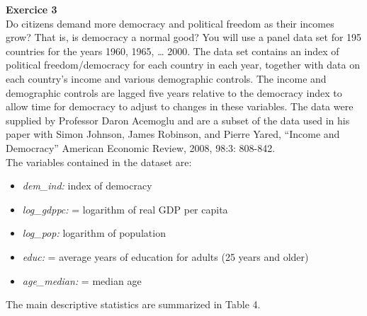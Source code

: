 \documentclass{article}
\begin{document}
\newpage

\textbf{Exercice 3} \\[1em]

Do citizens demand more democracy and political freedom as their incomes grow? That is, is democracy a normal good? You will use a panel data set for 195 countries for the years 1960, 1965, … 2000.  The data set contains an index of political freedom/democracy for each country in each year, together with data on each country’s income and various demographic controls. The income and demographic controls are lagged five years relative to the democracy index to allow time for democracy to adjust to changes in these variables. The data were supplied by Professor Daron Acemoglu and are a subset of the data used in his paper with Simon Johnson, James Robinson, and Pierre Yared, “Income and Democracy” American Economic Review, 2008, 98:3: 808-842.\\[1em]

The variables contained in the dataset are:

\begin{itemize}
    \item \textit{dem\_ind:} index of democracy
    \item \textit{log\_gdppc:} = logarithm of real GDP per capita
    \item \textit{log\_pop:} logarithm of population
    \item \textit{educ:} = average years of education for adults (25 years and older)
    \item \textit{age\_median:} = median age
\end{itemize}

\vspace{.5cm}
The main descriptive statistics are summarized in Table 4.

\end{document}

